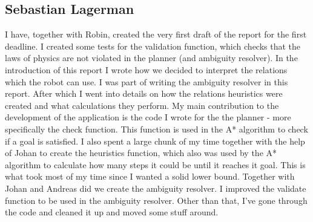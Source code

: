 \subsection*{Sebastian Lagerman}
I have, together with Robin, created the very first draft of the report for the first deadline.
\newline
\newline
I created some tests for the validation function, which checks that the laws of physics are not violated in the planner (and ambiguity resolver).
\newline
\newline
In the introduction of this report I wrote how we decided to interpret the relations which the robot can use.
I was part of writing the ambiguity resolver in this report.
After which I went into details on how the relations heuristics were created and what calculations they perform.
\newline
\newline
My main contribution to the development of the application is the code I wrote for the the planner - more specifically the check function.
This function is used in the A* algorithm to check if a goal is satisfied.
I also spent a large chunk of my time together with the help of Johan to create the heuristics function, which also was used by the A* algorithm to calculate how many steps it could be until it reaches it goal.
This is what took most of my time since I wanted a solid lower bound.
Together with Johan and Andreas did we create the ambiguity resolver.
I improved the validate function to be used in the ambiguity resolver.
Other than that, I've gone through the code and cleaned it up and moved some stuff around.

\newpage
